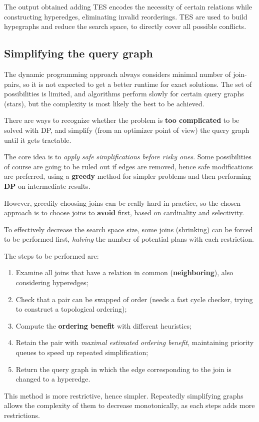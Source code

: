 The output obtained adding TES encodes the necessity of certain relations while constructing hyperedges, eliminating invalid reorderings. TES are used to build hypegraphs and reduce the search space, to directly cover all possible conflicts.

\subsection{Simplifying the query graph}
The dynamic programming approach always considers minimal number of join-pairs, so it is not expected to get a better runtime for exact solutions. The set of possibilities is limited, and algorithms perform slowly for certain query graphs (stars), but the complexity is most likely the best to be achieved.

There are ways to recognize whether the problem is \textbf{too complicated} to be solved with DP, and simplify (from an optimizer point of view) the query graph until it gets tractable. 

The core idea is to \textit{apply safe simplifications before risky ones}. Some possibilities of course are going to be ruled out if edges are removed, hence safe modifications are preferred, using a \textbf{greedy} method for simpler problems and then performing \textbf{DP} on intermediate results. 

However, greedily choosing joins can be really hard in practice, so the chosen approach is to choose joins to \textbf{avoid} first, based on cardinality and selectivity.

To effectively decrease the search space size, some joins (shrinking) can be forced to be performed first, \textit{halving} the number of potential plans with each restriction. 

The steps to be performed are:
\begin{enumerate}
	\item Examine all joins that have a relation in common (\textbf{neighboring}), also considering hyperedges;
	\item Check that a pair can be swapped of order (needs a fast cycle checker, trying to construct a topological ordering);
	\item Compute the \textbf{ordering benefit} with different heuristics;
	\item Retain the pair with \textit{maximal estimated ordering benefit}, maintaining priority queues to speed up repeated simplification;
	\item Return the query graph in which the edge corresponding to the join is changed to a hyperedge.
\end{enumerate}
This method is more restrictive, hence simpler. Repeatedly simplifying graphs allows the complexity of them to decrease monotonically, as each steps adds more restrictions.

